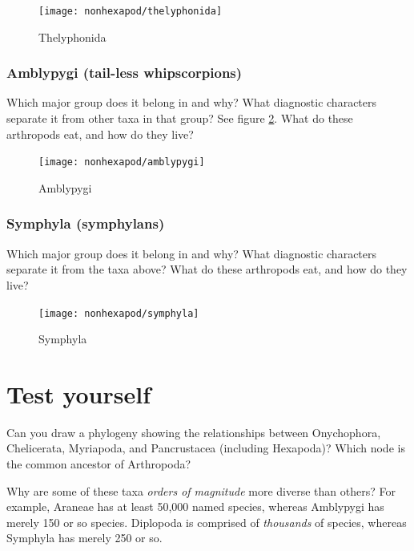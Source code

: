 \begin{figure}[ht!]
  \centering
    \texttt{[image: nonhexapod/thelyphonida]}
  \caption{Thelyphonida \citep[][Fig. 57]{bhlitem40112britmus}}
  \label{fig:thelyphonida}
\end{figure}

\subsubsection*{Amblypygi (tail-less whipscorpions)}
Which major group does it belong in and why? What diagnostic characters separate it from other taxa in that group? See figure \ref{fig:ambly1}. What do these arthropods eat, and how do they live?\vspace{3mm}

\begin{figure}[ht!]
  \centering
    \texttt{[image: nonhexapod/amblypygi]}
  \caption{Amblypygi \citep[][plate CCCXXXVI]{bhlitem55834arach}}
  \label{fig:ambly1}
\end{figure}

\subsubsection*{Symphyla (symphylans)}
Which major group does it belong in and why? What diagnostic characters separate it from the taxa above? What do these arthropods eat, and how do they live?\vspace{3mm}

\begin{figure}[ht!]
  \centering
    \texttt{[image: nonhexapod/symphyla]}
  \caption{Symphyla \citep[][Fig. 14B]{bhlitem16837entom}}
  \label{fig:symphyla}
\end{figure}

\section*{Test yourself}

\noindent{}Can you draw a phylogeny showing the relationships between Onychophora, Chelicerata, Myriapoda, and Pancrustacea (including Hexapoda)? Which node is the common ancestor of Arthropoda? \citep[Hint: see][]{Dunlop2013}\vspace{3mm}

\noindent{}Why are some of these taxa \textit{orders of magnitude} more diverse than others? For example, Araneae has at least 50,000 named species, whereas Amblypygi has merely 150 or so species. Diplopoda is comprised of \textit{thousands} of species, whereas Symphyla has merely 250 or so.

\clearpage
\thispagestyle{empty}

